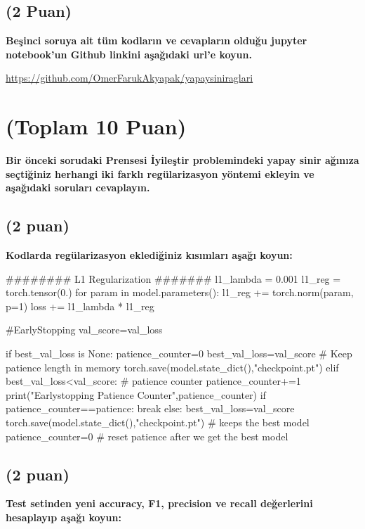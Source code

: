 \documentclass[11pt]{article}
\begin{document}
\subsection{(2 Puan)} \textbf{Beşinci soruya ait tüm kodların ve cevapların olduğu jupyter notebook'un Github linkini aşağıdaki url'e koyun.}

\url{https://github.com/OmerFarukAkyapak/yapaysiniraglari}

\section{(Toplam 10 Puan)} \textbf{Bir önceki sorudaki Prensesi İyileştir problemindeki yapay sinir ağınıza seçtiğiniz herhangi iki farklı regülarizasyon yöntemi ekleyin ve aşağıdaki soruları cevaplayın.} 

\subsection{(2 puan)} \textbf{Kodlarda regülarizasyon eklediğiniz kısımları aşağı koyun:} 

\begin{python}
######## L1 Regularization #######
        l1_lambda = 0.001
        l1_reg = torch.tensor(0.)
        for param in model.parameters():
            l1_reg += torch.norm(param, p=1)
        loss += l1_lambda * l1_reg

#EarlyStopping
        val_score=val_loss

        if best_val_loss is None:
          patience_counter=0
          best_val_loss=val_score       # Keep patience length in memory
          torch.save(model.state_dict(),"checkpoint.pt")
        elif best_val_loss<val_score:     # patience counter
          patience_counter+=1
          print("Earlystopping Patience Counter",patience_counter)
          if patience_counter==patience:           
            break
        else:
          best_val_loss=val_score
          torch.save(model.state_dict(),"checkpoint.pt")        # keeps the best model
          patience_counter=0        # reset patience after we get the best model
        
\end{python}

\subsection{(2 puan)} \textbf{Test setinden yeni accuracy, F1, precision ve recall değerlerini hesaplayıp aşağı koyun:}
\end{document}
